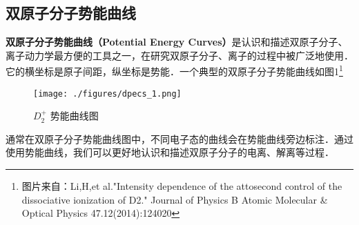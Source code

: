 
\begin{issues}
\issueDraft
\end{issues}

\subsection{双原子分子势能曲线}
\textbf{双原子分子势能曲线（Potential Energy Curves）}是认识和描述双原子分子、离子动力学最方便的工具之一，在研究双原子分子、离子的过程中被广泛地使用．
它的横坐标是原子间距，纵坐标是势能．一个典型的双原子分子势能曲线如图1\footnote{图片来自：Li,H,et al."Intensity dependence of the attosecond control of the dissociative ionization of D2." Journal of Physics B Atomic Molecular \& Optical Physics 47.12(2014):124020}

\begin{figure}[ht]
\centering
\texttt{[image: ./figures/dpecs\_1.png]}
\caption{$D_2^+$ 势能曲线图} \label{dpecs_fig1}
\end{figure}
通常在双原子分子势能曲线图中，不同电子态的曲线会在势能曲线旁边标注．通过使用势能曲线，我们可以更好地认识和描述双原子分子的电离、解离等过程．
